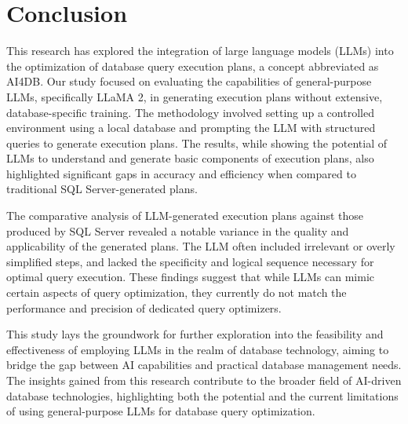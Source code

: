 \section{Conclusion}

This research has explored the integration of large language models (LLMs) into the optimization of database query execution plans, a concept abbreviated as AI4DB. Our study focused on evaluating the capabilities of general-purpose LLMs, specifically LLaMA 2, in generating execution plans without extensive, database-specific training. The methodology involved setting up a controlled environment using a local database and prompting the LLM with structured queries to generate execution plans. The results, while showing the potential of LLMs to understand and generate basic components of execution plans, also highlighted significant gaps in accuracy and efficiency when compared to traditional SQL Server-generated plans.

The comparative analysis of LLM-generated execution plans against those produced by SQL Server revealed a notable variance in the quality and applicability of the generated plans. The LLM often included irrelevant or overly simplified steps, and lacked the specificity and logical sequence necessary for optimal query execution. These findings suggest that while LLMs can mimic certain aspects of query optimization, they currently do not match the performance and precision of dedicated query optimizers.

This study lays the groundwork for further exploration into the feasibility and effectiveness of employing LLMs in the realm of database technology, aiming to bridge the gap between AI capabilities and practical database management needs. The insights gained from this research contribute to the broader field of AI-driven database technologies, highlighting both the potential and the current limitations of using general-purpose LLMs for database query optimization.